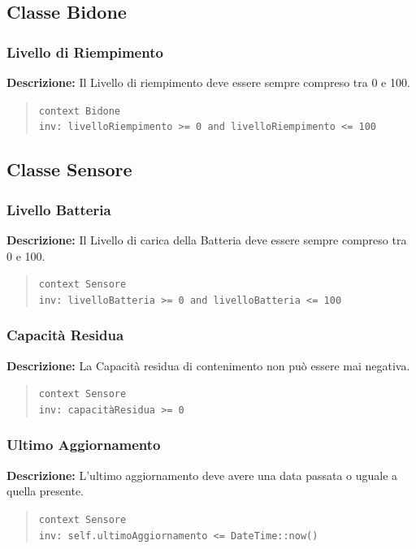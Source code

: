 \documentclass[12pt,a4paper]{article}
\begin{document}
\subsection{Classe Bidone}

\subsubsection{Livello di Riempimento} 
\textbf{Descrizione:} Il Livello di riempimento deve essere sempre compreso tra 0 e 100.
\begin{quote}
\texttt{context Bidone}  \\
\texttt{inv: livelloRiempimento >= 0 and livelloRiempimento <= 100} 
\end{quote}

\subsection{Classe Sensore}

\subsubsection{Livello Batteria} 
\textbf{Descrizione:} Il Livello di carica della Batteria deve essere sempre compreso tra 0 e 100.
\begin{quote}
\texttt{context Sensore}  \\
\texttt{inv: livelloBatteria >= 0 and livelloBatteria <= 100} 
\end{quote}

\subsubsection{Capacità Residua} 
\textbf{Descrizione:} La Capacità residua di contenimento non può essere mai negativa.
\begin{quote}
\texttt{context Sensore}  \\
\texttt{inv: capacitàResidua >= 0} 
\end{quote}

\subsubsection{Ultimo Aggiornamento} 
\textbf{Descrizione:} L'ultimo aggiornamento deve avere una data passata o uguale a quella presente.
\begin{quote}
\texttt{context Sensore}  \\
\texttt{inv: self.ultimoAggiornamento <= DateTime::now()} 
\end{quote}
\end{document}
